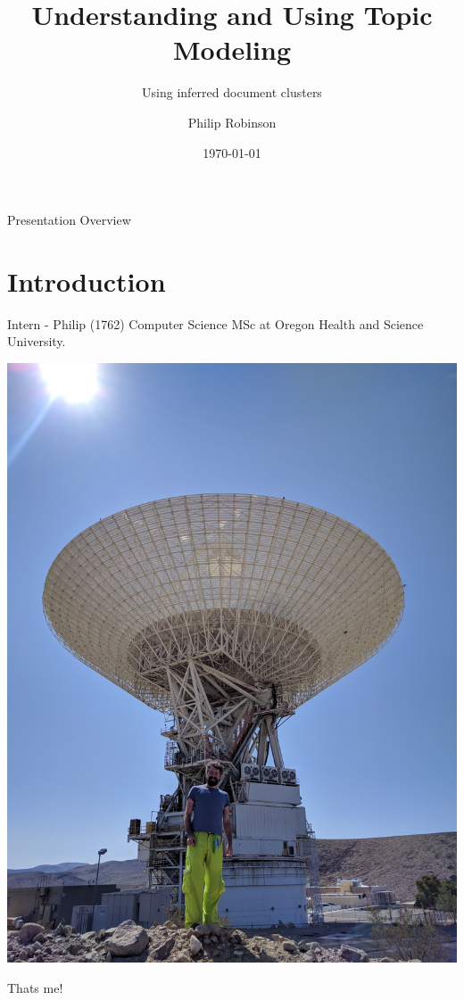 \documentclass[10pt]{beamer}
\title{Understanding and Using Topic Modeling}
\subtitle{Using inferred document clusters}
\author{Philip Robinson}
\date{\today}
\institute{Presented to itds \\ NASA - Jet Propulsion Lab}
\begin{document}
\begin{frame}
  \titlepage

\end{frame}


\begin{frame}{Presentation Overview}
  \tableofcontents

\end{frame}

\section{Introduction}
\begin{frame}{Intern - Philip (1762)}
  Computer Science MSc at Oregon Health and Science University.

  \vspace{1em}

  \begin{multicols}{2}
    \includegraphics[width=\columnwidth]{./philip.jpg}

    Thats me!
  \end{multicols}

\end{frame}
\end{document}
